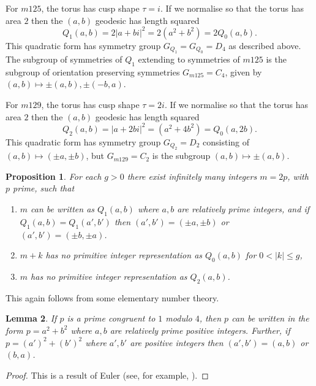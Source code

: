 \documentclass[reqno]{amsproc}  %
\newtheorem{prop}{\bf Proposition}[section]
\newtheorem{lem}[prop]{\bf Lemma}
\begin{document}
\smallskip
For $m125$, the torus has cusp shape $\tau = i $. If we normalise so that
the torus has area $2$ then the $(a,b)$ geodesic has length squared
\begin{equation}  \label{eq17}
Q_1(a,b)= 2 |a + b i |^2 = 2(a^2 + b^2) = 2 Q_0(a,b). 
\end{equation} 
This quadratic form has symmetry group $G_{Q_1}=G_{Q_0} = D_4$
as described above. 
The subgroup of symmetries of $Q_1$ extending to symmetries of $m125$
is the subgroup of orientation preserving symmetries $G_{m125} = C_4$, given by 
$(a,b) \mapsto  \pm(a, b), \pm(-b,a)$.

\smallskip
For $m129$, the torus has cusp shape $\tau = 2 i$. If we normalise so that
the torus has area $2$ then the $(a,b)$ geodesic has length squared
\begin{equation}  \label{eq18}
Q_2(a,b)={ |a+ 2bi|^2 } = (a^2+ 4b^2) = Q_0(a,2b).
\end{equation} 
This quadratic form has symmetry group $G_{Q_2} = D_2$
consisting of $(a,b) \mapsto (\pm a, \pm b)$, but $G_{m129} = C_2$ is
the subgroup $(a,b) \mapsto \pm(a,b)$.

\begin{prop}  \label{2p_with_big_gap}
For each $g >0$ there exist infinitely many integers $m=2p$, with $p$ prime,
such that
\begin{enumerate}
\item[(i)] $m$ can be written as $Q_1(a,b)$ where $a,b$ are relatively prime integers,
and if $Q_1(a,b)=Q_1(a',b')$ then $(a',b') = (\pm a, \pm b)$ or
$(a',b') = (\pm b, \pm a)$. 
\item[(ii)] $m+k$ has no primitive integer representation as $Q_0(a,b)$ for $0<|k|\le g$,
\item[(iii)] $m$ has no primitive integer representation as $Q_2(a,b)$.
\end{enumerate}
\end{prop}

This again follows from some elementary  number theory.
\begin{lem} \label{p=1mod4} If $p$ is a prime congruent to $1$ modulo $4$, 
then $p$ can be written  in the form
     $p= a^2 + b^2$
where $a,b$ are relatively prime positive integers.
Further, if $p=(a')^2+(b')^2$ where $a',b'$ are positive integers
then $(a',b')=(a,b)$ or $(b,a)$.
\end{lem}

\begin{proof}
This is a result of Euler 
(see, for example, \cite[Chapter 15]{HaWr}).
\end{proof}
\end{document}
